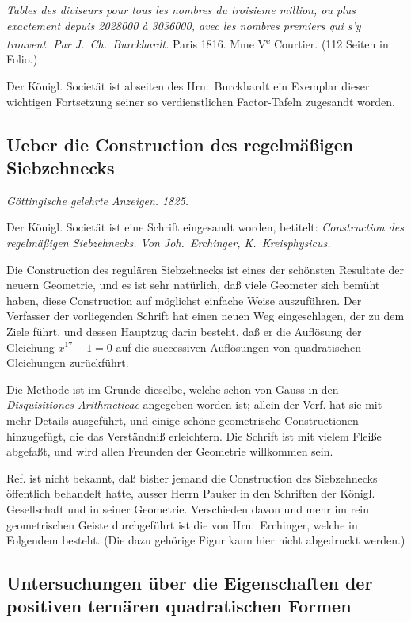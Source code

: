 \documentclass[12pt,a4paper]{article}
\theoremstyle{plain}
\theoremstyle{definition}
\theoremstyle{remark}
\begin{document}
\textit{Tables des diviseurs pour tous les nombres du troisieme million, ou plus exactement depuis 2028000 à 3036000, avec les nombres premiers qui s'y trouvent. Par J.\ Ch.\ Burckhardt.} Paris 1816. Mme V\textsuperscript{e} Courtier. (112 Seiten in Folio.)

Der Königl. Societät ist abseiten des Hrn.~Burckhardt ein Exemplar dieser wichtigen Fortsetzung seiner so verdienstlichen Factor-Tafeln zugesandt worden.

\subsection*{Ueber die Construction des regelmäßigen Siebzehnecks}

\textit{Göttingische gelehrte Anzeigen. 1825.}

Der Königl. Societät ist eine Schrift eingesandt worden, betitelt: \textit{Construction des regelmäßigen Siebzehnecks. Von Joh.~Erchinger, K.\ Kreisphysicus.}

Die Construction des regulären Siebzehnecks ist eines der schönsten Resultate der neuern Geometrie, und es ist sehr natürlich, daß viele Geometer sich bemüht haben, diese Construction auf möglichst einfache Weise auszuführen. Der Verfasser der vorliegenden Schrift hat einen neuen Weg eingeschlagen, der zu dem Ziele führt, und dessen Hauptzug darin besteht, daß er die Auflösung der Gleichung $x^{17} - 1 = 0$ auf die successiven Auflösungen von quadratischen Gleichungen zurückführt.

Die Methode ist im Grunde dieselbe, welche schon von Gauss in den \textit{Disquisitiones Arithmeticae} angegeben worden ist; allein der Verf. hat sie mit mehr Details ausgeführt, und einige schöne geometrische Constructionen hinzugefügt, die das Verständniß erleichtern. Die Schrift ist mit vielem Fleiße abgefaßt, und wird allen Freunden der Geometrie willkommen sein.

Ref. ist nicht bekannt, daß bisher jemand die Construction des Siebzehnecks öffentlich behandelt hatte, ausser Herrn Pauker in den Schriften der Königl. Gesellschaft und in seiner Geometrie. Verschieden davon und mehr im rein geometrischen Geiste durchgeführt ist die von Hrn.~Erchinger, welche in Folgendem besteht. (Die dazu gehörige Figur kann hier nicht abgedruckt werden.)

\subsection*{Untersuchungen über die Eigenschaften der positiven ternären quadratischen Formen}
\end{document}
